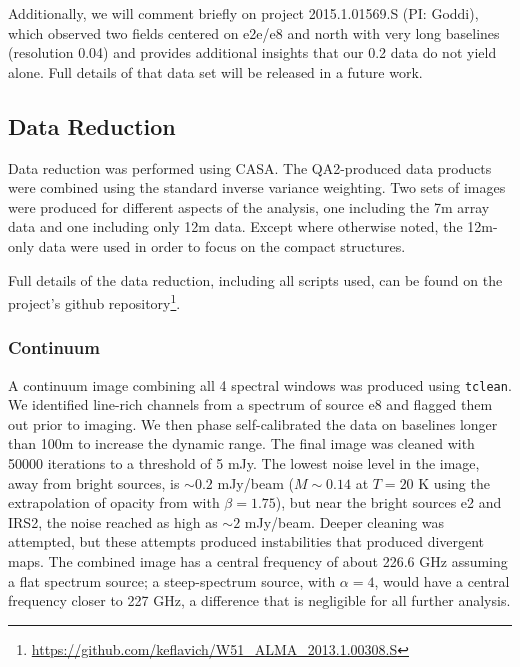 \documentclass{emulateapj}
\begin{document}

Additionally, we will comment briefly on project 2015.1.01569.S (PI: Goddi),
which observed two fields centered on e2e/e8 and north with very long baselines
(resolution 0.04\arcsec) and provides additional insights that our 0.2\arcsec
data do not yield alone.  Full details of that data set will be released in a
future work.



\subsection{Data Reduction}
Data reduction was performed using CASA.  The QA2-produced data products were
combined using the standard inverse variance weighting.  Two sets of images
were produced for different aspects of the analysis, one including the 7m array
data and one including only 12m data.  Except where otherwise noted, the
12m-only data were used in order to focus on the compact structures.

Full details of the data reduction, including all scripts used, can be found
on the project's github repository\footnote{\url{https://github.com/keflavich/W51_ALMA_2013.1.00308.S}}.


\subsubsection{Continuum}
A continuum image combining all 4 spectral windows was produced using
\texttt{tclean}.  We identified line-rich channels from a spectrum of source e8
and flagged them out prior to imaging.  We then phase self-calibrated the data
on baselines longer than 100m to increase the dynamic range.  The final image
was cleaned with 50000 iterations to a threshold of 5 mJy.  The lowest noise
level in the image, away from bright sources, is $\sim0.2$ mJy/beam
($M\sim0.14$ \msun at $T=20$ K using the extrapolation of
\citet{Ossenkopf1994a} opacity from \citet{Aguirre2011a} with $\beta=1.75$),
but near the bright sources e2 and IRS2, the noise reached as high as $\sim2$
mJy/beam.  Deeper cleaning was attempted, but these attempts produced
instabilities that produced divergent maps.  The combined image has a central
frequency of about 226.6 GHz assuming a flat spectrum source; a steep-spectrum
source, with $\alpha=4$, would have a central frequency closer to 227 GHz, a
difference that is negligible for all further analysis.
\end{document}
